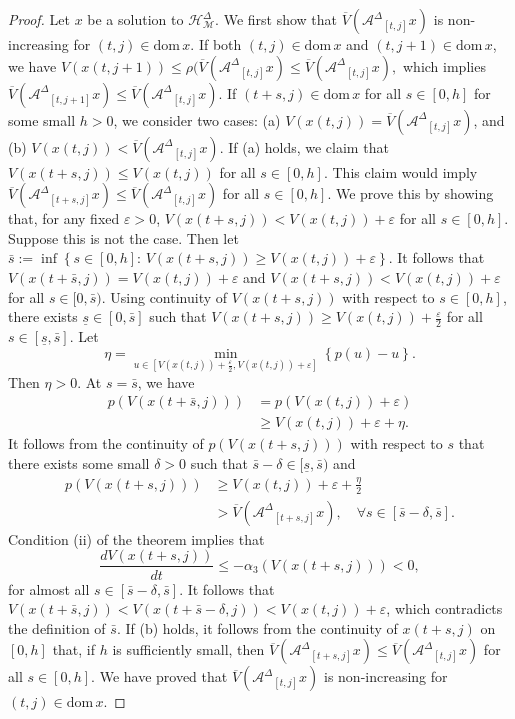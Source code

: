 \documentclass[journal,final,twocolumn]{IEEEtran}
\theoremstyle{definition}
\begin{document}
\begin{proof}
Let $x$ be a solution to ${\mathcal{H}_{\mathcal{M}}^{\Delta}}$. We first show that $\overline{V}({\mathcal{A}^{\Delta}}_{[t,j]}x)$ is non-increasing for $(t,j)\in{\text{dom}\,} x$. If both $(t,j)\in{\text{dom}\,} x$ and $(t,j+1)\in{\text{dom}\,} x$, we have
$
V(x(t,j+1))\le \rho(\overline{V}({\mathcal{A}^{\Delta}}_{[t,j]}x)\le \overline{V}({\mathcal{A}^{\Delta}}_{[t,j]}x),
$
which implies $\overline{V}({\mathcal{A}^{\Delta}}_{[t,j+1]}x)\le \overline{V}({\mathcal{A}^{\Delta}}_{[t,j]}x)$. If $(t+s,j)\in{\text{dom}\,} x$ for all $s\in [0,h]$ for some small $h>0$, we consider two cases: (a) $V(x(t,j))=\overline{V}({\mathcal{A}^{\Delta}}_{[t,j]}x)$, and (b) $V(x(t,j))<\overline{V}({\mathcal{A}^{\Delta}}_{[t,j]}x)$. If (a) holds, we claim that $V(x(t+s,j))\le V(x(t,j))$ for all $s\in [0,h]$. This claim would imply $\overline{V}({\mathcal{A}^{\Delta}}_{[t+s,j]}x)\le \overline{V}({\mathcal{A}^{\Delta}}_{[t,j]}x)$ for all $s\in [0,h]$. We prove this by showing that, for any fixed ${\varepsilon}>0$, $V(x(t+s,j))<V(x(t,j))+{\varepsilon}$ for all $s\in [0,h]$. Suppose this is not the case. Then let $\bar{s}:=\inf{\left\{{s\in [0,h]:\,V(x(t+s,j))\ge V(x(t,j))+{\varepsilon}}\right\}}$. It follows that $V(x(t+\bar{s},j))=V(x(t,j))+{\varepsilon}$ and $V(x(t+s,j))<V(x(t,j))+{\varepsilon}$ for all $s\in [0,\bar{s})$. Using continuity of $V(x(t+s,j))$ with respect to $s\in[0,h]$, there exists $\underline{s}\in[0,\bar{s}]$ such that $V(x(t+s,j))\ge V(x(t,j))+\frac{\varepsilon}{2}$ for all $s\in [\underline{s},\bar{s}]$. Let $$\eta=\min_{u\in[V(x(t,j))+\frac{\varepsilon}{2},V(x(t,j))+{\varepsilon}]}{\left\{{p(u)-u}\right\}}.$$
Then $\eta>0$. At $s=\bar{s}$, we have
\begin{align*}
p(V(x(t+\bar{s},j)))&=p(V(x(t,j))+{\varepsilon})\\
&\ge V(x(t,j))+{\varepsilon}+\eta.
\end{align*}
It follows from the continuity of $p(V(x(t+s,j)))$ with respect to $s$ that there exists some small $\delta>0$ such that $\bar{s}-\delta\in[\underline{s},\bar{s})$ and
\begin{align*}
p(V(x(t+s,j)))&\ge V(x(t,j))+{\varepsilon}+\frac{\eta}{2}\\
&> \overline{V}({\mathcal{A}^{\Delta}}_{[t+s,j]}x),\quad\forall s\in [\bar{s}-\delta,\bar{s}].
\end{align*}
Condition (ii) of the theorem implies that
$$
\frac{dV(x(t+s,j))}{dt}\le -\alpha_3(V(x(t+s,j)))<0,
$$
for almost all $s\in [\bar{s}-\delta,\bar{s}]$. It follows that $V(x(t+\bar{s},j))<V(x(t+\bar{s}-\delta,j))<V(x(t,j))+{\varepsilon}$, which contradicts the definition of $\bar{s}$. If (b) holds, it follows from the continuity of $x(t+s,j)$ on $[0,h]$ that, if $h$ is sufficiently small, then $\overline{V}({\mathcal{A}^{\Delta}}_{[t+s,j]}x)\le \overline{V}({\mathcal{A}^{\Delta}}_{[t,j]}x)$ for all $s\in [0,h]$. We have proved that $\overline{V}({\mathcal{A}^{\Delta}}_{[t,j]}x)$ is non-increasing for $(t,j)\in{\text{dom}\,} x$.


\end{proof}
\end{document}

